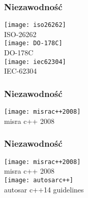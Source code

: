 \documentclass{beamer}
\begin{document}
\begin{frame}[t]
    \frametitle{Niezawodność}

    \begin{center}
        \texttt{[image: iso26262]}\\
        \tiny \cite{iso26262} ISO-26262\\
        \vspace{5 mm}
        \texttt{[image: DO-178C]}\\
        \tiny \cite{do178c} DO-178C\\      
        \vspace{5 mm}
        \texttt{[image: iec62304]}\\
        \tiny \cite{iec62304} IEC-62304\\          
    \end{center}     
\end{frame}
\begin{frame}[t]
    \frametitle{Niezawodność}

    \begin{center}
        \texttt{[image: misrac++2008]}\\
        \tiny \cite{misrac++2008} misra c++ 2008\\
    \end{center}    
\end{frame}
\begin{frame}[t]
    \frametitle{Niezawodność}

    \begin{center}
        \texttt{[image: misrac++2008]}\\
        \tiny \cite{misrac++2008} misra c++ 2008\\
        \vspace{5 mm}
        \texttt{[image: autosarc++]}\\
        \tiny \cite{autosarc++14} autosar c++14 guidelines\\  
    \end{center}    
\end{frame}
\end{document}
